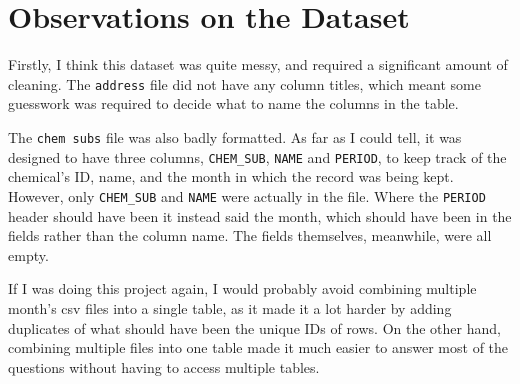 \documentclass{report}
\begin{document}
\chapter{Observations on the Dataset}
Firstly, I think this dataset was quite messy, and required a significant amount of cleaning. The \texttt{address} file did not have any column titles, which meant some guesswork was required to decide what to name the columns in the table.

The \texttt{chem subs} file was also badly formatted. As far as I could tell, it was designed to have three columns, \texttt{CHEM\_SUB}, \texttt{NAME} and \texttt{PERIOD}, to keep track of the chemical's ID, name, and the month in which the record was being kept. However, only \texttt{CHEM\_SUB} and \texttt{NAME} were actually in the file. Where the \texttt{PERIOD} header should have been it instead said the month, which should have been in the fields rather than the column name. The fields themselves, meanwhile, were all empty.

If I was doing this project again, I would probably avoid combining multiple month's csv files into a single table, as it made it a lot harder by adding duplicates of what should have been the unique IDs of rows. On the other hand, combining multiple files into one table made it much easier to answer most of the questions without having to access multiple tables. 
\end{document}
